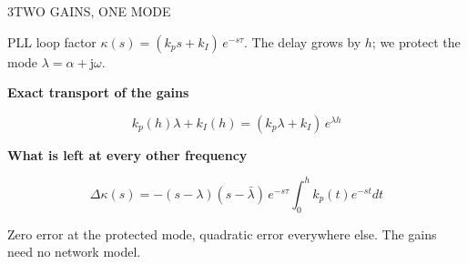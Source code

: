 \begin{minipage}[t][\PosterTopRowHeight][t]{\PosterThreeWidth}\vspace{0pt}
  \begin{TicketTwoPanel}{\PosterTopRowHeight}{3}{TWO GAINS, ONE MODE}

    {\FigureSize PLL loop factor $\kappa(s)=(k_p s+k_I)\,e^{-s\tau}$. The delay grows by $h$; we protect the mode $\lambda=\alpha+\mathrm{j}\omega$.\par}
    \vspace{1mm}
    {\FigureSize\textbf{Exact transport of the gains}\par}
    {\HeroEquation\color{IASBlue}\[
      k_p(h)\lambda+k_I(h)=(k_p\lambda+k_I)\,e^{\lambda h}
    \]}
    \vspace{-2mm}
    {\FigureSize\textbf{What is left at every other frequency}\par}
    {\fontsize{33pt}{38pt}\selectfont\color{IASBlue}\[
      \Delta\kappa(s)=-(s-\lambda)(s-\bar\lambda)\,e^{-s\tau}\!\!\int_0^h\!\! k_p(t)e^{-st}dt
    \]}
    \vspace{3mm}
    \begin{InWords}\InWordsLabel Zero error at the protected mode, quadratic error everywhere else. The gains need no network model.\end{InWords}

  \end{TicketTwoPanel}
\end{minipage}%
